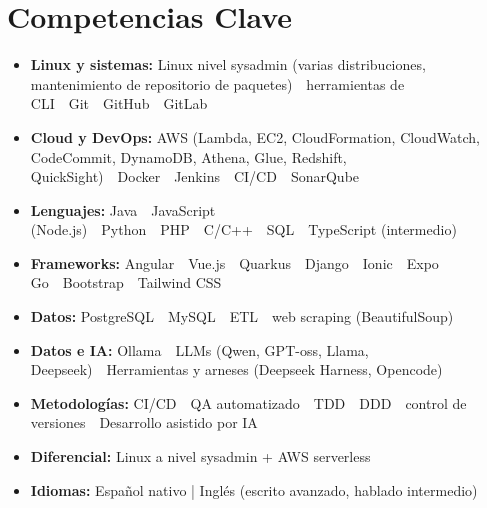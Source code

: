 \documentclass[10pt,letterpaper]{article}
\newcommand{\cvskill}[2]{\item \textbf{#1:} #2}
\newcommand{\sep}{\ \textbullet\ }
\begin{document}
\section{Competencias Clave}
\begin{itemize}
  \cvskill{Linux y sistemas}{Linux nivel sysadmin (varias distribuciones, mantenimiento de repositorio de paquetes)\sep herramientas de CLI\sep Git\sep GitHub\sep GitLab}
  \cvskill{Cloud y DevOps}{AWS (Lambda, EC2, CloudFormation, CloudWatch, CodeCommit, DynamoDB, Athena, Glue, Redshift, QuickSight)\sep Docker\sep Jenkins\sep CI/CD\sep SonarQube}
  \cvskill{Lenguajes}{Java\sep JavaScript (Node.js)\sep Python\sep PHP\sep C/C++\sep SQL\sep TypeScript (intermedio)}
  \cvskill{Frameworks}{Angular\sep Vue.js\sep Quarkus\sep Django\sep Ionic\sep Expo Go\sep Bootstrap\sep Tailwind CSS}
  \cvskill{Datos}{PostgreSQL\sep MySQL\sep ETL\sep web scraping (BeautifulSoup)}
  \cvskill{Datos e IA}{Ollama\sep LLMs (Qwen, GPT-oss, Llama, Deepseek)\sep Herramientas y arneses (Deepseek Harness, Opencode)}
  \cvskill{Metodologías}{CI/CD\sep QA automatizado\sep TDD\sep DDD\sep control de versiones}\sep Desarrollo asistido por IA
  \cvskill{Diferencial}{Linux a nivel sysadmin + AWS serverless}
  \cvskill{Idiomas}{Español nativo | Inglés (escrito avanzado, hablado intermedio)}
\end{itemize}
\end{document}
